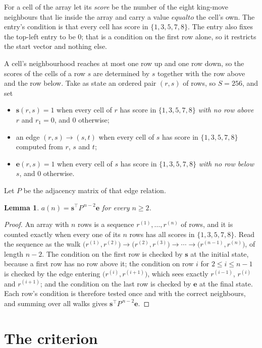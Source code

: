 \documentclass[11pt,a4paper]{article}
\theoremstyle{plain}
\newtheorem{lemma}[theorem]{Lemma}
\theoremstyle{definition}
\begin{document}
For a cell of the array let its \emph{score} be the number of the eight king-move neighbours that lie inside
the array and carry a value $equal to$ the cell's own. The entry's condition is that every cell
has score in $\{1,3,5,7,8\}$. The entry also fixes the top-left entry to be $0$; that is a condition on the first row alone, so it restricts the start vector and nothing else.

A cell's neighbourhood reaches at most one row up and one row down, so the scores of the
cells of a row $s$ are determined by $s$ together with the row above and the row below.
Take as state an ordered pair $(r,s)$ of rows, so $S=256$, and set
\begin{itemize}
\item $\mathbf{s}(r,s)=1$ when every cell of $r$ has score in $\{1,3,5,7,8\}$ \emph{with no row
above $r$} and $r_1=0$, and $0$ otherwise;
\item an edge $(r,s)\to(s,t)$ when every cell of $s$ has score in $\{1,3,5,7,8\}$ computed from
$r$, $s$ and $t$;
\item $\mathbf{e}(r,s)=1$ when every cell of $s$ has score in $\{1,3,5,7,8\}$ \emph{with no row
below $s$}, and $0$ otherwise.
\end{itemize}
Let $P$ be the adjacency matrix of that edge relation.

\begin{lemma}\label{lem:walk}
$a(n)=\mathbf{s}^{\!\top}P^{\,n-2}\mathbf{e}$ for every $n\ge2$.
\end{lemma}

\begin{proof}
An array with $n$ rows is a sequence $r^{(1)},\dots,r^{(n)}$ of rows, and it is counted
exactly when every one of its $n$ rows has all scores in $\{1,3,5,7,8\}$. Read the sequence as the
walk $\bigl(r^{(1)},r^{(2)}\bigr)\to\bigl(r^{(2)},r^{(3)}\bigr)\to\cdots\to
\bigl(r^{(n-1)},r^{(n)}\bigr)$, of length $n-2$. The condition on the first row is
checked by $\mathbf{s}$ at the initial state, because a first row has no row above it; the
condition on row $i$ for $2\le i\le n-1$ is checked by the edge entering
$\bigl(r^{(i)},r^{(i+1)}\bigr)$, which sees exactly $r^{(i-1)}$, $r^{(i)}$ and
$r^{(i+1)}$; and the condition on the last row is checked by $\mathbf{e}$ at the final
state. Each row's condition is therefore tested once and with the correct neighbours, and
summing over all walks gives $\mathbf{s}^{\!\top}P^{\,n-2}\mathbf{e}$.
\end{proof}

\section{The criterion}
\end{document}

